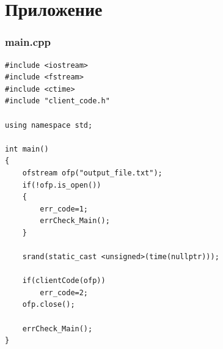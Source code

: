 \documentclass[a4paper,14pt]{article}
\begin{document}
\printbibliography

\clearpage

\section{Приложение}
\subsubsection{main.cpp}
\begin{verbatim}
#include <iostream>
#include <fstream>
#include <ctime>
#include "client_code.h"

using namespace std;

int main()
{
    ofstream ofp("output_file.txt");
    if(!ofp.is_open())
    {
        err_code=1;
        errCheck_Main();
    }

    srand(static_cast <unsigned>(time(nullptr)));

    if(clientCode(ofp))
        err_code=2;
    ofp.close();

    errCheck_Main();
}

\end{verbatim}
\end{document}
